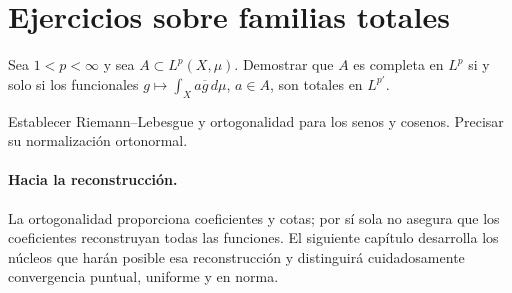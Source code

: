 \section{Ejercicios sobre familias totales}
\begin{ejercicio}\label{ej:v4-l03-1}
Sea $1<p<\infty$ y sea $A\subset L^p(X,\mu)$. Demostrar que $A$ es completa en $L^p$ si y solo si los funcionales $g\mapsto\int_X a\overline g\,d\mu$, $a\in A$, son totales en $L^{p'}$.
\end{ejercicio}

\begin{ejercicio}\label{ej:v4-l03-2}
Establecer Riemann--Lebesgue y ortogonalidad para los senos y cosenos. Precisar su normalización ortonormal.
\end{ejercicio}


\paragraph{Hacia la reconstrucción.}
La ortogonalidad proporciona coeficientes y cotas; por sí sola no asegura que los coeficientes reconstruyan todas las funciones. El siguiente capítulo desarrolla los núcleos que harán posible esa reconstrucción y distinguirá cuidadosamente convergencia puntual, uniforme y en norma.
